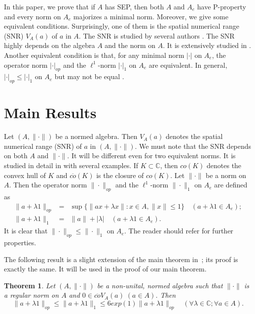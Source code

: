 \documentclass{amsart}
\theoremstyle{plain}
\newtheorem{thm}[defn]{Theorem}
\numberwithin{equation}{section}
\begin{document}
In this paper, we prove that if $A$ has SEP, then both $A$ and $A_e$ have P-property and every norm on $A_e$ majorizes  a minimal norm. Moreover, we give some equivalent conditions. Surprisingly, one of them is the spatial numerical range (SNR) $V_A(a)$ of $a$ in $A$. The SNR is studied by several authors \cite{GaHu:89, Ta:00}. The SNR highly depends on the algebra $A$ and the norm on $A$. It is extensively studied in \cite{DePa:21}. Another equivalent condition is that, for any minimal norm $|\cdot|$ on $A_e$, the operator norm $|\cdot|_{op}$ and the $\ell^1$-norm $|\cdot|_1$ on $A_e$ are equivalent. In general, $|\cdot|_{op} \leq |\cdot|_1$ on $A_e$ but may not be equal \cite{DPa:21}.

\section{Main Results}
Let $(A, \|\cdot\|)$ be a normed algebra. Then $V_A(a)$ denotes the spatial numerical range (SNR) of $a$ in $(A, \|\cdot\|)$. We must note that the SNR depends on both $A$ and $\|\cdot\|$. It will be different even for two equivalent norms. It is studied in detail in \cite{DePa:21} with several examples. If $K \subset \mathbb C$, then $co(K)$ denotes the convex hull of $K$ and $\overline{co}(K)$ is the closure of $co(K)$. Let $\|\cdot\|$ be a norm on $A$. Then the operator norm $\|\cdot\|_{op}$ and the $\ell^1$-norm $\|\cdot\|_1$ on $A_e$ are defined as
\begin{eqnarray*}
\|a+\lambda 1\|_{op} & = & \sup\{\|a x + \lambda x \|: x \in A, \|x\| \leq 1\} \quad{(a + \lambda1 \in A_e)};\\
\|a+\lambda 1\|_1 & = & \|a\| + |\lambda| \quad{(a + \lambda1 \in A_e)}.
\end{eqnarray*}
It is clear that $\|\cdot\|_{op} \leq \|\cdot\|_1$ on $A_e$. The reader should refer \cite{DePa:21} for further properties.

The following result is a slight extension of the main theorem in~\cite{GaKo:93}; its proof is exactly the same. It will be used in the proof of our main theorem.

\begin{thm}\label{C}
Let $(A, \|\cdot\|)$ be a non-unital, normed algebra such that $\|\cdot\|$ is a regular norm on $A$ and $0 \in \overline{co}V_A(a) \; (a \in A)$. Then $$\|a + \lambda 1\|_{op} \leq \|a + \lambda 1\|_1 \leq 6 exp(1) \|a + \lambda 1\|_{op} \quad(\forall \lambda \in \mathbb C; \forall a \in A).$$
\end{thm}
\end{document}
